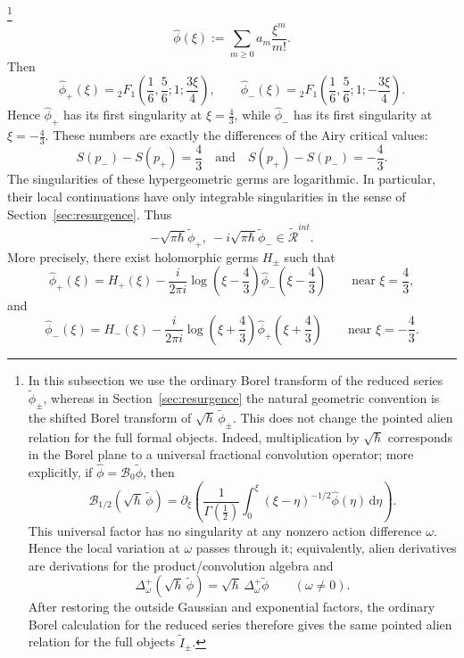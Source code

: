 \documentclass[11pt]{amsart}
\theoremstyle{plain}
\newcommand{\dd}{\mathrm d}
\begin{document}
\footnote{In this subsection we use the ordinary Borel transform of the
reduced series \(\widetilde\phi_\pm\), whereas in Section~\ref{sec:resurgence} the natural
geometric convention is the shifted Borel transform of
\(\sqrt{\hbar}\,\widetilde\phi_\pm\).  This does not change the pointed
alien relation for the full formal objects.  Indeed, multiplication by
\(\sqrt{\hbar}\) corresponds in the Borel plane to a universal fractional
convolution operator; more explicitly, if
\(\widehat\phi=\mathcal B_0\widetilde\phi\), then
\[
\mathcal B_{1/2}(\sqrt{\hbar}\,\widetilde\phi)
=
\partial_\xi\left(
\frac{1}{\Gamma(\frac12)}
\int_0^\xi
(\xi-\eta)^{-1/2}\widehat\phi(\eta)\,\dd\eta
\right).
\]
This universal factor has no singularity at any nonzero action difference
\(\omega\).  Hence the local variation at \(\omega\) passes through it; 
equivalently, alien derivatives are derivations for the product/convolution
algebra and
\[
\Delta_\omega^+(\sqrt{\hbar}\,\widetilde\phi)
=
\sqrt{\hbar}\,\Delta_\omega^+\widetilde\phi
\qquad (\omega\neq0).
\]
After restoring the outside Gaussian and exponential factors, the ordinary
Borel calculation for the reduced series therefore gives the same pointed
alien relation for the full objects \(\widetilde I_\pm\).}
\begin{equation*}
\widehat\phi(\xi):=\sum_{m\ge0}a_m\frac{\xi^m}{m!}.
\end{equation*}
Then
\begin{equation*}
\widehat\phi_+(\xi)
=
{}_2F_1\!\left(\frac16,\frac56;1;\frac{3\xi}{4}\right),
\qquad
\widehat\phi_-(\xi)
=
{}_2F_1\!\left(\frac16,\frac56;1;-\frac{3\xi}{4}\right).
\end{equation*}
Hence \(\widehat\phi_+\) has its first singularity at \(\xi=\frac43\), while \(\widehat\phi_-\) has its first singularity at \(\xi=-\frac43\). These numbers are exactly the differences of the Airy critical values: 
$$
S(p_-)-S(p_+)=\frac43\quad \text{and} \quad S(p_+)-S(p_-)=-\frac43.  
$$
The singularities of these hypergeometric germs are logarithmic. In particular, their local continuations have only integrable singularities in the sense of Section~\ref{sec:resurgence}. Thus 
\[-\sqrt{\pi \hbar} \widetilde{\phi}_+, \ -i\sqrt{\pi \hbar} \widetilde{\phi}_- \in \widetilde{\mathcal{R}}^{int}.\]
More precisely, there exist holomorphic germs \(H_\pm\) such that
\begin{equation*}
\widehat\phi_+(\xi)
=
H_+(\xi)
-\frac{i}{2\pi i}\log\!\left(\xi-\frac43\right)\widehat\phi_-\!\left(\xi-\frac43\right)
\qquad\text{near }\xi=\frac43,
\end{equation*}
and
\begin{equation*}
\widehat\phi_-(\xi)
=
H_-(\xi)
-\frac{i}{2\pi i}\log\!\left(\xi+\frac43\right)\widehat\phi_+\!\left(\xi+\frac43\right)
\qquad\text{near }\xi=-\frac43.
\end{equation*}
\end{document}
